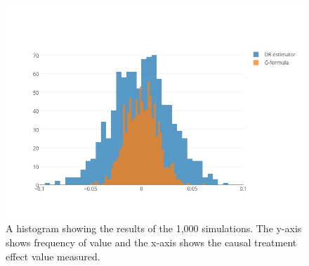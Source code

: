 \begin{figure}[h!]
\includegraphics[width = .8\linewidth]{figures/overlaid_histogram.jpeg}
\caption[Histogram of simulation results under the null hypothesis]{A histogram showing the results of the 1,000 simulations.  The y-axis shows frequency of value and the x-axis shows the causal treatment effect value measured.}
\label{bighistogram}
\end{figure}


